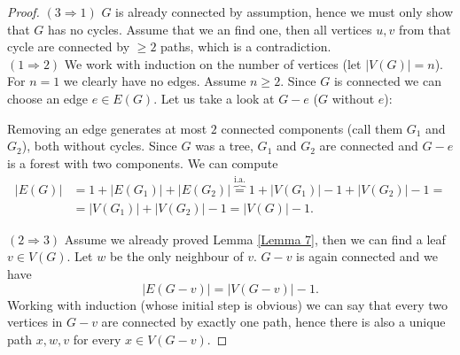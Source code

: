 \documentclass[a4paper]{article}
\theoremstyle{plain}
\theoremstyle{myremark}
\begin{document}
\begin{proof}
\emph{$(3\Rightarrow 1)$} $G$ is already connected by assumption, hence we must only show that $G$ has no cycles. Assume that we an find one, then all vertices $u,v$ from that cycle are connected by $\geqslant 2$ paths, which is a contradiction.
\\ \emph{$(1\Rightarrow 2)$} We work with induction on the number of vertices (let $|V(G)|=n$). For $n=1$ we clearly have no edges. Assume $n\geqslant 2$. Since $G$ is connected we can choose an edge $e\in E(G)$. Let us take a look at $G-e$ ($G$ without $e$):
\begin{figure}[H]
\begin{center}
\end{center}
\end{figure}
Removing an edge generates at most $2$ connected components (call them $G_1$ and $G_2$), both without cycles. Since $G$ was a tree, $G_1$ and $G_2$ are connected and $G-e$ is a forest with two components. We can compute
\begin{align*}
|E(G)|&=1+|E(G_1)|+|E(G_2)|\overbrace{=}^{\text{i.a.}}1+|V(G_1)|-1+|V(G_2)|-1=\\
&=|V(G_1)|+|V(G_2)|-1 = |V(G)|-1.
\end{align*}

\emph{$(2\Rightarrow 3)$} Assume we already proved Lemma \ref{Lemma 7}, then we can find a leaf $v\in V(G)$. Let $w$ be the only neighbour of $v$. $G-v$ is again connected and we have
$$|E(G-v)|=|V(G-v)|-1.$$
Working with induction (whose initial step is obvious) we can say that every two vertices in $G-v$ are connected by exactly one path, hence there is also a unique path $x,w,v$ for every $x\in V(G-v)$.
\end{proof}
\end{document}
